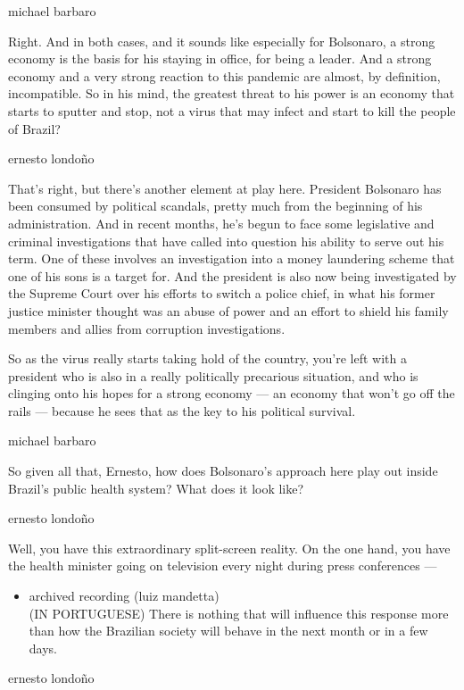 michael barbaro

Right. And in both cases, and it sounds like especially for Bolsonaro, a
strong economy is the basis for his staying in office, for being a
leader. And a strong economy and a very strong reaction to this pandemic
are almost, by definition, incompatible. So in his mind, the greatest
threat to his power is an economy that starts to sputter and stop, not a
virus that may infect and start to kill the people of Brazil?

ernesto londoño

That's right, but there's another element at play here. President
Bolsonaro has been consumed by political scandals, pretty much from the
beginning of his administration. And in recent months, he's begun to
face some legislative and criminal investigations that have called into
question his ability to serve out his term. One of these involves an
investigation into a money laundering scheme that one of his sons is a
target for. And the president is also now being investigated by the
Supreme Court over his efforts to switch a police chief, in what his
former justice minister thought was an abuse of power and an effort to
shield his family members and allies from corruption investigations.

So as the virus really starts taking hold of the country, you're left
with a president who is also in a really politically precarious
situation, and who is clinging onto his hopes for a strong economy ---
an economy that won't go off the rails --- because he sees that as the
key to his political survival.

michael barbaro

So given all that, Ernesto, how does Bolsonaro's approach here play out
inside Brazil's public health system? What does it look like?

ernesto londoño

Well, you have this extraordinary split-screen reality. On the one hand,
you have the health minister going on television every night during
press conferences ---

\begin{itemize}
\tightlist
\item
  archived recording (luiz mandetta)\\
  (IN PORTUGUESE) There is nothing that will influence this response
  more than how the Brazilian society will behave in the next month or
  in a few days.
\end{itemize}

ernesto londoño

